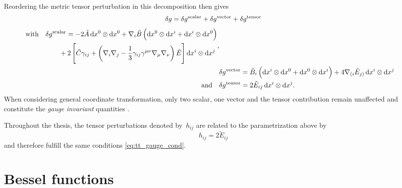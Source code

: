 Reordering the metric tensor perturbation in this decomposition then gives
\begin{equation}
	\delta g = \delta g^{\mathrm{scalar}} + \delta g^{\mathrm{vector}} + \delta g^{\mathrm{tensor}} \\
\end{equation}
\begin{align}
	\begin{split}
	\text{with} \quad &\delta g^{\mathrm{scalar}} = -2\tilde{A} \dxdx{0}{0} + \covd_i\tilde{B}\del{\dxdx{0}{i} + \dxdx{i}{0}} \\
		&\qquad + 2\sbr{\tilde{C}\gamma_{ij} + \del{\covd_i\covd_j-\frac{1}{3}\gamma_{ij}\gamma^{\mu\nu}\covd_\mu\covd_\nu}\tilde{E}}\dxdx{i}{j}
	\end{split} \eqpunct{,} \\
	&\delta g^{\mathrm{vector}} = \tilde{B}_i\del{\dxdx{i}{0} + \dxdx{0}{i}} + 4 \covd_{(i}\tilde{E}_{j)}\dxdx{i}{j} \\
	\text{and} \quad &\delta g^{\mathrm{tensor}} = 2 \tilde{E}_{ij}\dxdx{i}{j}
	\eqpunct{.}
\end{align}
When considering general coordinate transformation, only two scalar, one vector and the tensor contribution remain unaffected and constitute the \emph{gauge invariant} quantities \autocite{Schuller,Weinberg}.

Throughout the thesis, the tensor perturbations denoted by~\(h_{ij}\) are related to the parametrization above by
\begin{equation}
	h_{ij} = 2 \tilde{E}_{ij}
\end{equation}
and therefore fulfill the same conditions \eqref{eq:tt_gauge_cond}.


\section{Bessel functions}\label{app:bessel}

